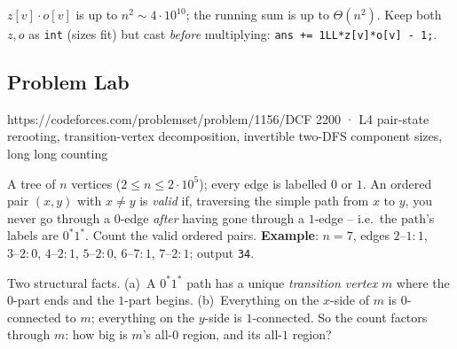 \begin{warningbox}
$z[v]\cdot o[v]$ is up to $n^2 \sim 4\cdot10^{10}$; the running sum is up to
$\Theta(n^2)$. Keep both $z,o$ as \lstinline{int} (sizes fit) but cast
\emph{before} multiplying: \lstinline{ans += 1LL*z[v]*o[v] - 1;}.
\end{warningbox}

\subsection{Problem Lab}

  {https://codeforces.com/problemset/problem/1156/D}{CF 2200 · L4}
  {pair-state rerooting, transition-vertex decomposition, invertible two-DFS
   component sizes, long long counting}

\begin{problemstatement}
A tree of $n$ vertices ($2 \le n \le 2\cdot10^{5}$); every edge is labelled $0$
or $1$. An ordered pair $(x,y)$ with $x \ne y$ is \emph{valid} if, traversing
the simple path from $x$ to $y$, you never go through a $0$-edge \emph{after}
having gone through a $1$-edge -- i.e.\ the path's labels are $0^{\ast}1^{\ast}$.
Count the valid ordered pairs. \textbf{Example}: $n=7$, edges
$2\text{--}1{:}1$, $3\text{--}2{:}0$, $4\text{--}2{:}1$, $5\text{--}2{:}0$,
$6\text{--}7{:}1$, $7\text{--}2{:}1$; output \texttt{34}.
\end{problemstatement}

\begin{attemptgate}
Two structural facts. (a)~A $0^{\ast}1^{\ast}$ path has a unique
\emph{transition vertex} $m$ where the $0$-part ends and the $1$-part begins.
(b)~Everything on the $x$-side of $m$ is $0$-connected to $m$; everything on
the $y$-side is $1$-connected. So the count factors through $m$: how big is
$m$'s all-$0$ region, and its all-$1$ region?
\end{attemptgate}

